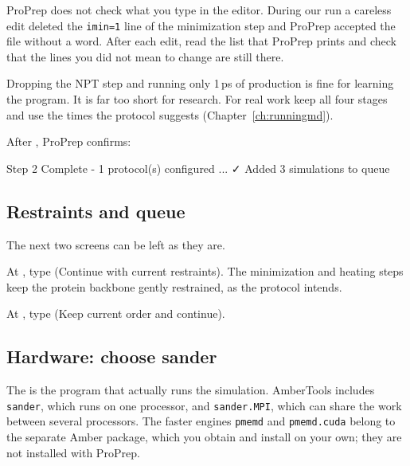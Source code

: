 \begin{watchout}
ProPrep does not check what you type in the editor. During our run a
careless edit deleted the \texttt{imin=1} line of the minimization step and
ProPrep accepted the file without a word. After each edit, read the
 list that ProPrep prints and check that the lines you
did not mean to change are still there.
\end{watchout}

\begin{tip}
Dropping the NPT step and running only 1\,ps of production is fine for
learning the program. It is far too short for research. For real work keep
all four stages and use the times the protocol suggests
(Chapter~\ref{ch:runningmd}).
\end{tip}

After , ProPrep confirms:

\begin{screen}
Step 2 Complete - 1 protocol(s) configured
...
✓ Added 3 simulations to queue
\end{screen}

\subsection{Restraints and queue}

The next two screens can be left as they are.

\begin{steps}
  \item At , type  (Continue
        with current restraints). The minimization and heating steps keep the
        protein backbone gently restrained, as the protocol intends.
  \item At , type  (Keep current
        order and continue).
\end{steps}

\subsection{Hardware: choose sander}\label{sec:tutorial-engine}

The  is the program that actually runs the simulation.
AmberTools includes \texttt{sander}, which runs on one processor, and
\texttt{sander.MPI}, which can share the work between several processors.
The faster engines \texttt{pmemd} and \texttt{pmemd.cuda} belong to the
separate Amber package, which you obtain and install on your own; they are not
installed with ProPrep.

